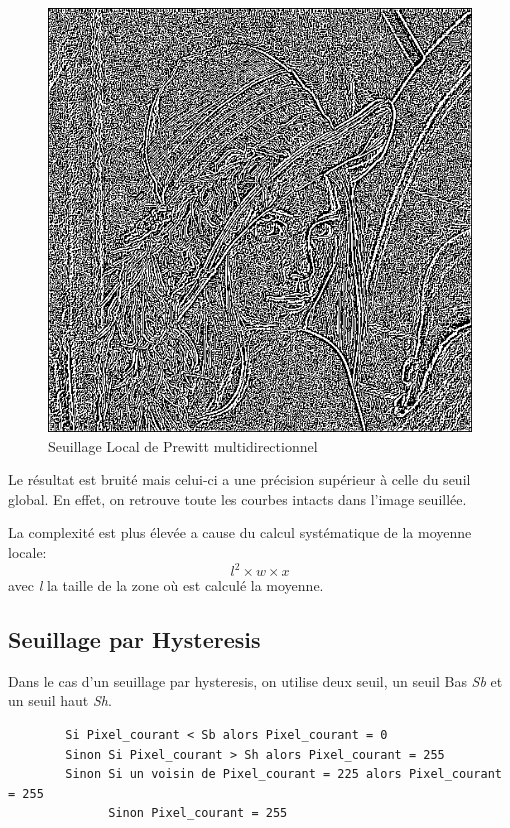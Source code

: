 \documentclass[11pt]{article}
\begin{document}
	\begin{figure}[H]
		\centering
		\includegraphics[scale=0.25]{Image/seuilLocal.png}
		\caption{Seuillage Local de Prewitt multidirectionnel}
		\label{fig:seuilLocal}
	\end{figure} 

	Le résultat est  bruité mais celui-ci a une précision supérieur à celle du seuil global. 
	En effet, on retrouve toute les courbes intacts dans l'image seuillée.

	La complexité est plus élevée a cause du calcul systématique de la moyenne locale: \[l^2 \times w \times x\]
	avec \textit{l} la taille de la zone où est calculé la moyenne.

	\subsection{Seuillage par Hysteresis}\label{hysteresis}

	Dans le cas d'un seuillage par hysteresis, on utilise deux seuil, un seuil Bas \textit{Sb} et un seuil haut \textit{Sh}.

	\begin{verbatim}
		Si Pixel_courant < Sb alors Pixel_courant = 0
		Sinon Si Pixel_courant > Sh alors Pixel_courant = 255
		Sinon Si un voisin de Pixel_courant = 225 alors Pixel_courant = 255
		      Sinon Pixel_courant = 255
	\end{verbatim}
\end{document}
